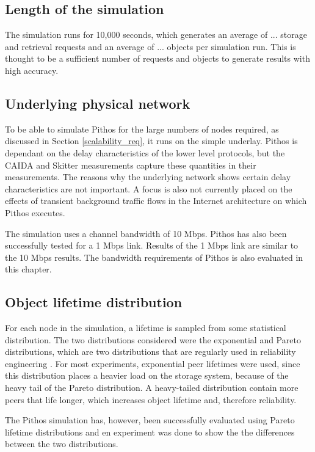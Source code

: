 \subsection{Length of the simulation}
The simulation runs for 10,000 seconds, which generates an average of ... storage and retrieval requests and an average of ... objects per simulation run. This is thought to be a sufficient number of requests and objects to generate results with high accuracy.

\subsection{Underlying physical network}
To be able to simulate Pithos for the large numbers of nodes required, as discussed in Section \ref{scalability_req}, it runs on the simple underlay. Pithos is dependant on the delay characteristics of the lower level protocols, but the CAIDA and Skitter measurements capture these quantities in their measurements. The reasons why the underlying network shows certain delay characteristics are not important. A focus is also not currently placed on the effects of transient background traffic flows in the Internet architecture on which Pithos executes.

The simulation uses a channel bandwidth of 10 Mbps. Pithos has also been successfully tested for a 1 Mbps link. Results of the 1 Mbps link are similar to the 10 Mbps results. The bandwidth requirements of Pithos is also evaluated in this chapter.

\subsection{Object lifetime distribution}
For each node in the simulation, a lifetime is sampled from some statistical distribution. The two distributions considered were the exponential and Pareto distributions, which are two distributions that are regularly used in reliability engineering \cite{rausand2004systemreliability}. For most experiments, exponential peer lifetimes were used, since this distribution places a heavier load on the storage system, because of the heavy tail of the Pareto distribution. A heavy-tailed distribution contain more peers that life longer, which increases object lifetime and, therefore reliability.

The Pithos simulation has, however, been successfully evaluated using Pareto lifetime distributions and en experiment was done to show the the differences between the two distributions.

